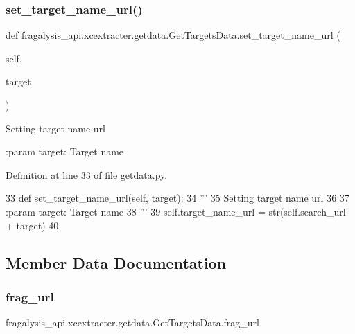 \subsubsection{\texorpdfstring{set\+\_\+target\+\_\+name\+\_\+url()}{set\_target\_name\_url()}}
{\footnotesize\ttfamily def fragalysis\+\_\+api.\+xcextracter.\+getdata.\+Get\+Targets\+Data.\+set\+\_\+target\+\_\+name\+\_\+url (\begin{DoxyParamCaption}\item[{}]{self,  }\item[{}]{target }\end{DoxyParamCaption})}

\begin{DoxyVerb}Setting target name url

:param target: Target name
\end{DoxyVerb}
 

Definition at line 33 of file getdata.\+py.


\begin{DoxyCode}
33     \textcolor{keyword}{def }set\_target\_name\_url(self, target):
34         \textcolor{stringliteral}{'''}
35 \textcolor{stringliteral}{        Setting target name url}
36 \textcolor{stringliteral}{}
37 \textcolor{stringliteral}{        :param target: Target name}
38 \textcolor{stringliteral}{        '''}
39         self.target\_name\_url = str(self.search\_url + target)
40 
\end{DoxyCode}


\subsection{Member Data Documentation}
\mbox{\label{classfragalysis__api_1_1xcextracter_1_1getdata_1_1_get_targets_data_afa8f34da2572edae8988c21829ce9c3e}} 
\subsubsection{\texorpdfstring{frag\+\_\+url}{frag\_url}}
{\footnotesize\ttfamily fragalysis\+\_\+api.\+xcextracter.\+getdata.\+Get\+Targets\+Data.\+frag\+\_\+url}



